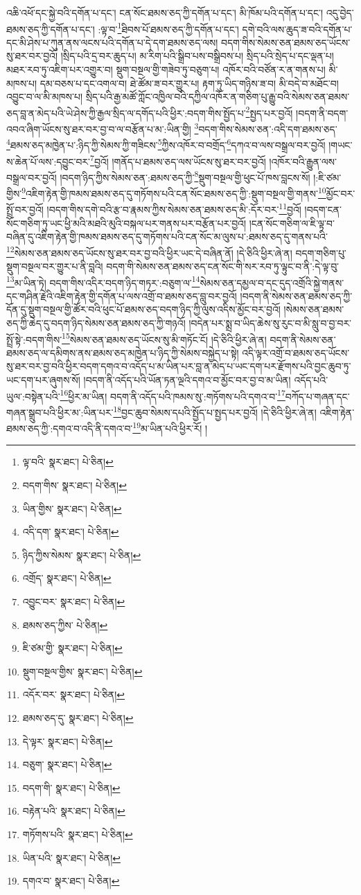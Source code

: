 འཆི་འཕོ་དང་སྐྱེ་བའི་དགོན་པ་དང་། ངན་སོང་ཐམས་ཅད་ཀྱི་དགོན་པ་དང་། མི་ཁོམ་པའི་དགོན་པ་དང་། འདུ་བྱེད་ཐམས་ཅད་ཀྱི་དགོན་པ་དང་། :ལྟ་བ་\footnote{ལྟ་བའི་  སྣར་ཐང་།  པེ་ཅིན། }ཐིབས་པོ་ཐམས་ཅད་ཀྱི་དགོན་པ་དང་། དགེ་བའི་ལས་ཆུད་ཟ་བའི་དགོན་པ་དང་མི་ཤེས་པ་ཀུན་ནས་ལངས་པའི་དགོན་པ་དེ་དག་ཐམས་ཅད་ལས། བདག་གིས་སེམས་ཅན་ཐམས་ཅད་ཡོངས་སུ་ཐར་བར་བྱའོ། །སྲིད་པའི་དྲ་བར་ཆུད་པ། མ་རིག་པའི་སྒྲིབ་པས་བསྒྲིབས་པ། སྲིད་པའི་སྲེད་པ་དང་ལྡན་པ། མཐར་རབ་ཏུ་འཇིག་པར་འགྱུར་བ། སྡུག་བསྔལ་གྱི་གཟེབ་ཏུ་བཅུག་པ། འཁོར་བའི་བཙོན་ར་ན་གནས་པ། མི་མཁས་པ། དམ་བཅས་པ་དང་འགལ་བ། ཐེ་ཚོམ་ཟ་བར་གྱུར་པ། རྟག་ཏུ་ཡིད་གཉིས་ཟ་བ། མི་བདེ་བ་མཐོང་བ། འབྱུང་བ་ལ་མི་མཁས་པ། སྲིད་པའི་རྒྱ་མཚོ་ཀློང་འཁྱིལ་བའི་དཀྱིལ་འཁོར་ན་གཅིག་པུ་རྒྱུ་བའི་སེམས་ཅན་ཐམས་ཅད་བླ་ན་མེད་པའི་ཡེ་ཤེས་ཀྱི་རྒྱལ་སྲིད་ལ་དགོད་པའི་ཕྱིར་:བདག་གིས་སྤྱོད་པ་\footnote{བདག་གིས་  སྣར་ཐང་།  པེ་ཅིན། }སྤྱད་པར་བྱའོ། །བདག་ནི་བདག་འབའ་ཞིག་ཡོངས་སུ་ཐར་བར་བྱ་བ་ལ་བརྩོན་པ་མ་:ཡིན་གྱི། \footnote{ཡིན་གྱིས་  སྣར་ཐང་།  པེ་ཅིན། }བདག་གིས་སེམས་ཅན་:འདི་དག་ཐམས་ཅད་\footnote{འདི་དག་  སྣར་ཐང་།  པེ་ཅིན། }ཐམས་ཅད་མཁྱེན་པ་:ཉིད་ཀྱི་སེམས་ཀྱི་གཟིངས་\footnote{ཉིད་ཀྱིས་སེམས་  སྣར་ཐང་།  པེ་ཅིན། }ཀྱིས་འཁོར་བ་བགྲོད་\footnote{འགྲོད་  སྣར་ཐང་།  པེ་ཅིན། }དཀའ་བ་ལས་བསྒྲལ་བར་བྱའོ། །གཡང་ས་ཆེན་པོ་ལས་:དབྱུང་བར་\footnote{འབྱུང་བར་  སྣར་ཐང་།  པེ་ཅིན། }བྱའོ། །གནོད་པ་ཐམས་ཅད་ལས་ཡོངས་སུ་ཐར་བར་བྱའོ། །འཁོར་བའི་རྒྱུན་ལས་བསྒྲལ་བར་བྱའོ། །བདག་ཉིད་ཀྱིས་སེམས་ཅན་:ཐམས་ཅད་ཀྱི་\footnote{ཐམས་ཅད་ཀྱིས་  པེ་ཅིན། }སྡུག་བསྔལ་གྱི་ཕུང་པོ་ཁས་བླངས་སོ། །:ཇི་ཙམ་གྱིས་\footnote{ཇི་ཙམ་གྱི་  སྣར་ཐང་།  པེ་ཅིན། }འཇིག་རྟེན་གྱི་ཁམས་ཐམས་ཅད་དུ་གཏོགས་པའི་ངན་སོང་ཐམས་ཅད་ཀྱི་:སྡུག་བསྔལ་གྱི་གནས་\footnote{སྡུག་བསྔལ་གྱིས་  སྣར་ཐང་།  པེ་ཅིན། }མྱོང་བར་སྤྲོ་བར་བྱའོ། །བདག་གིས་དགེ་བའི་རྩ་བ་རྣམས་ཀྱིས་སེམས་ཅན་ཐམས་ཅད་མི་:དོར་བར་\footnote{འདོར་བར་  སྣར་ཐང་།  པེ་ཅིན། }བྱའོ། །བདག་ངན་སོང་གཅིག་ཏུ་ཡང་ཕྱི་མའི་མཐའི་མུའི་བསྐལ་པར་གནས་པར་བརྩོན་པར་བྱའོ། །ངན་སོང་གཅིག་ལ་ཇི་ལྟ་བ་བཞིན་དུ་འཇིག་རྟེན་གྱི་ཁམས་ཐམས་ཅད་དུ་གཏོགས་པའི་ངན་སོང་མ་ལུས་པ་:ཐམས་ཅད་དུ་གནས་པའི་\footnote{ཐམས་ཅད་དུ་  སྣར་ཐང་།  པེ་ཅིན། }སེམས་ཅན་ཐམས་ཅད་ཡོངས་སུ་ཐར་བར་བྱ་བའི་ཕྱིར་ཡང་དེ་བཞིན་ནོ། །དེ་ཅིའི་ཕྱིར་ཞེ་ན། བདག་གཅིག་པུ་སྡུག་བསྔལ་བར་གྱུར་པ་ནི་བླའི། བདག་གི་སེམས་ཅན་ཐམས་ཅད་ངན་སོང་གི་སར་རབ་ཏུ་ལྟུང་བ་ནི་:དེ་ལྟ་བུ་\footnote{དེ་ལྟར་  སྣར་ཐང་།  པེ་ཅིན། }མ་ཡིན་ཏེ། བདག་གིས་འདིར་བདག་ཉིད་གཏར་:བཅུག་ལ་\footnote{བཅུག་  སྣར་ཐང་།  པེ་ཅིན། }སེམས་ཅན་དམྱལ་བ་དང་དུད་འགྲོའི་སྐྱེ་གནས་དང་གཤིན་རྗེའི་འཇིག་རྟེན་གྱི་དགོན་པ་ལས་འགྲོ་བ་ཐམས་ཅད་བླུ་བར་བྱའོ། །བདག་ནི་སེམས་ཅན་ཐམས་ཅད་ཀྱི་དོན་དུ་སྡུག་བསྔལ་གྱི་ཚོར་བའི་ཕུང་པོ་ཐམས་ཅད་བདག་ཉིད་ཀྱི་ལུས་འདིས་མྱོང་བར་བྱའོ། །སེམས་ཅན་ཐམས་ཅད་ཀྱི་ཆེད་དུ་བདག་ཉིད་སེམས་ཅན་ཐམས་ཅད་ཀྱི་གཉའོ། །བདེན་པར་སྨྲ་བ་ཡིད་ཆེས་སུ་རུང་བ་མི་སླུ་བ་བྱ་བར་སྤྲོ་སྟེ་:བདག་གིས་\footnote{བདག་གི་  སྣར་ཐང་།  པེ་ཅིན། }སེམས་ཅན་ཐམས་ཅད་ཡོངས་སུ་མི་གཏོང་ངོ། །དེ་ཅིའི་ཕྱིར་ཞེ་ན། བདག་ནི་སེམས་ཅན་ཐམས་ཅད་ལ་དམིགས་ནས་ཐམས་ཅད་མཁྱེན་པ་ཉིད་ཀྱི་སེམས་བསྐྱེད་པ་སྟེ། འདི་ལྟར་འགྲོ་བ་ཐམས་ཅད་ཡོངས་སུ་ཐར་བར་བྱ་བའི་ཕྱིར་བདག་དགའ་བ་འདོད་པ་མ་ཡིན་པར་བླ་ན་མེད་པ་ཡང་དག་པར་རྫོགས་པའི་བྱང་ཆུབ་ཏུ་ཡང་དག་པར་ཞུགས་སོ། །བདག་ནི་འདོད་པའི་ཡོན་ཏན་ལྔའི་དགའ་བ་མྱོང་བར་བྱ་བ་མ་ཡིན། འདོད་པའི་ཡུལ་:བསྟེན་པའི་\footnote{བརྟེན་པའི་  སྣར་ཐང་།  པེ་ཅིན། }ཕྱིར་མ་ཡིན། བདག་ནི་འདོད་པའི་ཁམས་སུ་:གཏོགས་པའི་དགའ་བ་\footnote{གཏོགས་པའི་  སྣར་ཐང་།  པེ་ཅིན། }བཀོད་པ་གཞན་དང་གཞན་སྒྲུབ་པའི་ཕྱིར་མ་:ཡིན་པར་\footnote{ཡིན་པའི་  སྣར་ཐང་།  པེ་ཅིན། }བྱང་ཆུབ་སེམས་དཔའི་སྤྱོད་པ་སྤྱད་པར་བྱའོ། །དེ་ཅིའི་ཕྱིར་ཞེ་ན། འཇིག་རྟེན་ཐམས་ཅད་ཀྱི་:དགའ་བ་འདི་ནི་དགའ་བ་\footnote{དགའ་བ་  སྣར་ཐང་།  པེ་ཅིན། }མ་ཡིན་པའི་ཕྱིར་རོ། །
